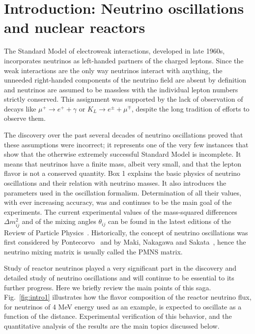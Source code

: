 \section{Introduction: Neutrino oscillations and nuclear reactors} 
\label{sec:intro}

The Standard Model of electroweak interactions,
developed in late 1960s, incorporates neutrinos as left-handed partners of the charged leptons. Since the weak interactions are the
only way neutrinos interact with anything, the unneeded right-handed components of the neutrino field are absent 
by definition and neutrinos are assumed to be massless with the individual lepton numbers strictly conserved.
This assignment was supported by the lack of observation of decays like 
$\mu^+ \rightarrow e^+ + \gamma$ or $K_L \rightarrow e^{\pm} + \mu^{\mp}$,
despite the long tradition of efforts to observe them.

The discovery over the past several decades
of neutrino oscillations proved that these assumptions were incorrect; it
represents one of the very few instances that show that the otherwise
extremely successful Standard Model is incomplete. It means that
neutrinos have a finite mass, albeit very small, and that the lepton flavor is not a conserved quantity.
Box 1 explains the basic physics of neutrino oscillations and their relation with neutrino masses. It
also introduces the parameters used in the oscillation formalism. Determination of all their values,
with ever increasing accuracy,
was and continues to be the main goal of the experiments.
The current experimental values of the mass-squared differences $\Delta m^2_{ij}$ and of the mixing angles $\theta_{ij}$ can be found
in the latest editions of the Review of Particle Physics~\cite{PDG14}.
Historically, the concept of neutrino oscillations was first considered by Pontecorvo~\cite{Pontecorvo57, Pontecorvo58}
and by Maki, Nakagawa and Sakata~\cite{MNS62}, hence the neutrino mixing matrix is usually called the PMNS matrix.

Study of reactor neutrinos played a very significant part in the discovery and detailed study of neutrino oscillations and will continue 
to be essential to its further progress. Here we briefly review
the main points of this saga. Fig.~\ref{fig:intro1} illustrates how the flavor composition of the reactor neutrino flux, for neutrinos of 4 MeV energy
used as an example, is expected to oscillate as a function of the distance. Experimental verification of this behavior, and the quantitative analysis of the
results are the main topics discussed below.

